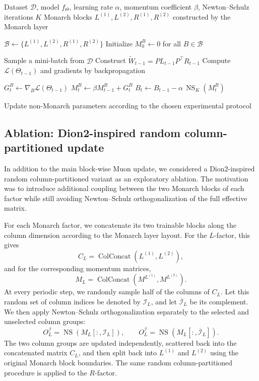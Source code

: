 \documentclass{article}
\begin{document}
\begin{algorithm}[H]
\caption{Block-wise Muon for Monarch-parameterized layers}
\label{alg:block_muon}
\footnotesize
\begin{algorithmic}[1]
\Require Dataset \(\mathcal{D}\), model \(f_\Theta\), learning rate \(\alpha\), momentum coefficient \(\beta\), Newton--Schulz iterations \(K\)
\Require Monarch blocks \(L^{(1)},L^{(2)},R^{(1)},R^{(2)}\) constructed by the Monarch layer

\State \(\mathcal{B}\gets\{L^{(1)},L^{(2)},R^{(1)},R^{(2)}\}\)
\State Initialize \(M_0^B\gets 0\) for all \(B\in\mathcal{B}\)

    \State Sample a mini-batch from \(\mathcal{D}\)
    \State Construct \(\widetilde{W}_{t-1}=P L_{t-1}P^\top R_{t-1}\)
    \State Compute \(\mathcal{L}(\Theta_{t-1})\) and gradients by backpropagation

        \State \(G_t^B \gets \nabla_B\mathcal{L}(\Theta_{t-1})\)
        \State \(M_t^B \gets \beta M_{t-1}^B + G_t^B\)
        \State \(B_t \gets B_{t-1} - \alpha\,\operatorname{NS}_K(M_t^B)\)
    \EndFor

    \State Update non-Monarch parameters according to the chosen experimental protocol
\EndFor
\end{algorithmic}
\end{algorithm}

\subsection{Ablation: Dion2-inspired random column-partitioned update}

In addition to the main block-wise Muon update, we considered a Dion2-inspired random column-partitioned variant as an exploratory ablation. The motivation was to introduce additional coupling between the two Monarch blocks of each factor while still avoiding Newton--Schulz orthogonalization of the full effective matrix.

For each Monarch factor, we concatenate its two trainable blocks along the column dimension according to the Monarch layer layout. For the \(L\)-factor, this gives
\[
C_L = \operatorname{ColConcat}\!\left(L^{(1)}, L^{(2)}\right),
\]
and for the corresponding momentum matrices,
\[
M_L = \operatorname{ColConcat}\!\left(M^{L^{(1)}}, M^{L^{(2)}}\right).
\]
At every periodic step, we randomly sample half of the columns of \(C_L\). Let this random set of column indices be denoted by \(\mathcal{I}_L\), and let \(\overline{\mathcal{I}}_L\) be its complement. We then apply Newton--Schulz orthogonalization separately to the selected and unselected column groups:
\[
O_L^{\mathcal{I}}
=
\operatorname{NS}\!\left(M_L[:, \mathcal{I}_L]\right),
\qquad
O_L^{\overline{\mathcal{I}}}
=
\operatorname{NS}\!\left(M_L[:, \overline{\mathcal{I}}_L]\right).
\]
The two column groups are updated independently, scattered back into the concatenated matrix \(C_L\), and then split back into \(L^{(1)}\) and \(L^{(2)}\) using the original Monarch block boundaries. The same random column-partitioned procedure is applied to the \(R\)-factor.
\end{document}
